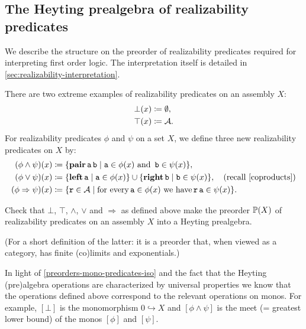 \subsection{The Heyting prealgebra of realizability predicates}%
\label{sec:Heyting-prealgebra-realizability-predicates}

We describe the structure on the preorder of realizability
predicates required for interpreting first order logic.
%
The interpretation itself is detailed in
\cref{sec:realizability-interpretation}.

\begin{definition}
  There are two extreme examples of realizability predicates on an assembly \(X\):
  \begin{align*}
    \bot(x) &\coloneqq \emptyset, \\
    \top(x) &\coloneqq \AA.
  \end{align*}
  For realizability predicates \(\phi\) and \(\psi\) on a set \(X\), we define
  three new realizability predicates on \(X\) by:
  \begin{align*}
    (\phi \land \psi)(x) &\coloneqq \set{\pcapair\pca{a}\pca{b} \mid
      \pca{a} \in \phi(x) \text{ and } \pca{b} \in \psi(x)}, \\
    (\phi \lor \psi)(x) &\coloneqq
    \set{\pcaleft\pca{a} \mid \pca{a} \in \phi(x)} \cup
    \set{\pcaright\pca{b} \mid \pca{b} \in \psi(x)},
                          \quad(\text{recall~\cref{coproducts}}) \\
    (\phi \Rightarrow \psi)(x) &\coloneqq
    \set{\pca{r} \in \AA \mid \text{for every}
    \pca{a} \in \phi(x) \text{ we have} \pca{r}\pca{a} \in \psi(x)}.
  \end{align*}
\end{definition}

\begin{exercise}\label{exer:predicates-heyting-prealgebra}
  Check that \(\bot\), \(\top\), \(\land\), \(\lor\) and \(\Rightarrow\) as
  defined above make the preorder \(\realpred(X)\) of realizability predicates
  on an assembly \(X\) into a Heyting prealgebra.

  (For a short definition of the latter: it is a preorder that, when viewed as a
  category, has finite (co)limits and exponentials.)
\end{exercise}

In light of \cref{preorders-mono-predicates-iso} and the fact that the Heyting
(pre)algebra operations are characterized by universal properties we know that
the operations defined above correspond to the relevant operations on monos. For
example, \([\bot]\) is the monomorphism \(0 \hookrightarrow X\) and
\([\phi\land\psi]\) is the meet (= greatest lower bound) of the monos \([\phi]\)
and \([\psi]\).

